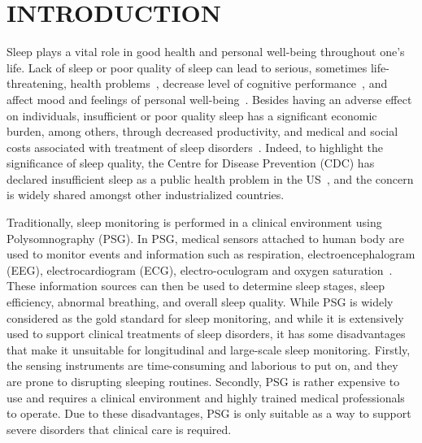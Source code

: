\section{INTRODUCTION}\label{sec:1introduction}

Sleep plays a vital role in good health and personal well-being throughout one's life. Lack of sleep or poor quality of sleep can lead to
serious, sometimes life-threatening, health problems~\cite{altena2008sleep,chandola2010effect,lallukka2016contribution}, decrease level of
cognitive performance~\cite{alhola07sleep,akerstedt07altered}, and affect mood and feelings of personal
well-being~\cite{paunio09longitudinal,pilcher97sleep}. Besides having an adverse effect on individuals, insufficient or poor quality sleep
has a significant economic burden, among others, through decreased productivity, and medical and social costs associated with treatment of
sleep disorders~\cite{hafner17why}. Indeed, to highlight the significance of sleep quality, the Centre for Disease Prevention (CDC) has
declared insufficient sleep as a public health problem in the US~\cite{sleepreport}, and the concern is widely shared amongst other
industrialized countries.

Traditionally, sleep monitoring is performed in a clinical environment using Polysomnography (PSG). In PSG, medical sensors attached to
human body are used to monitor events and information such as respiration, electroencephalogram (EEG), electrocardiogram (ECG),
electro-oculogram and oxygen saturation~\cite{ebrahimi2008automatic,saper2005hypothalamic,oropesa1999sleep,langkvist2012sleep}. These
information sources can then be used to determine
sleep stages, sleep efficiency, abnormal breathing, and overall sleep quality. While PSG is widely considered as the gold standard for sleep monitoring, and while it is extensively used to support clinical treatments of sleep disorders, it has some disadvantages that make it unsuitable for longitudinal and large-scale sleep monitoring. Firstly, the sensing instruments are time-consuming and laborious to put on, and they are prone to disrupting sleeping routines.  Secondly, PSG is rather expensive to use and requires a clinical environment and highly trained medical professionals to operate. Due to these disadvantages, PSG is only suitable as a way to support severe disorders that clinical care is required. %


